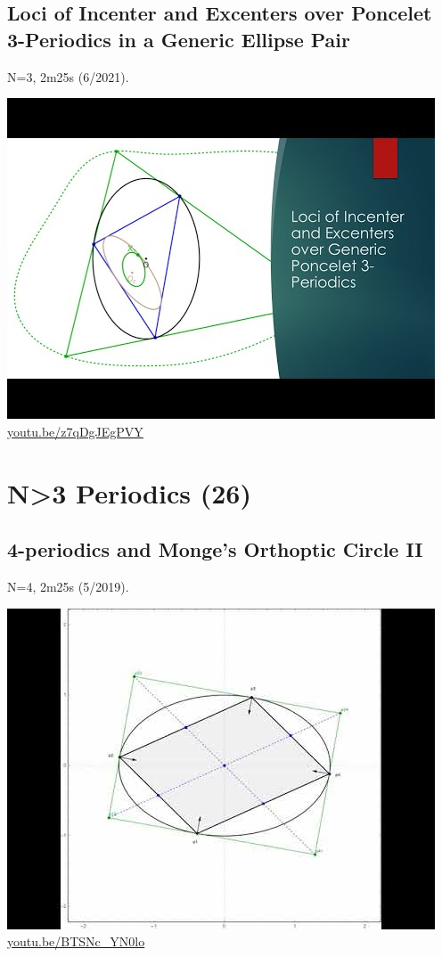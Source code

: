 \documentclass[12pt]{amsart}
\begin{document}
\subsection{Loci of Incenter and Excenters over Poncelet 3-Periodics in a Generic Ellipse Pair}
\label{vid:z7qDgJEgPVY}
\noindent N=3, 2m25s (6/2021). 
\begin{center}\includegraphics[width=.5\textwidth]{pics/z7qDgJEgPVY.jpg} \\ 
\href{https://youtu.be/z7qDgJEgPVY}{\url{youtu.be/z7qDgJEgPVY}}\end{center}
% 

\section{N>3 Periodics (26)}

\subsection{4-periodics and Monge's Orthoptic Circle II}
\label{vid:BTSNc_YN0lo}
\noindent N=4, 2m25s (5/2019). 
\begin{center}\includegraphics[width=.5\textwidth]{pics/BTSNc_YN0lo.jpg} \\ 
\href{https://youtu.be/BTSNc_YN0lo}{\url{youtu.be/BTSNc\_YN0lo}}\end{center}
% 
\end{document}
